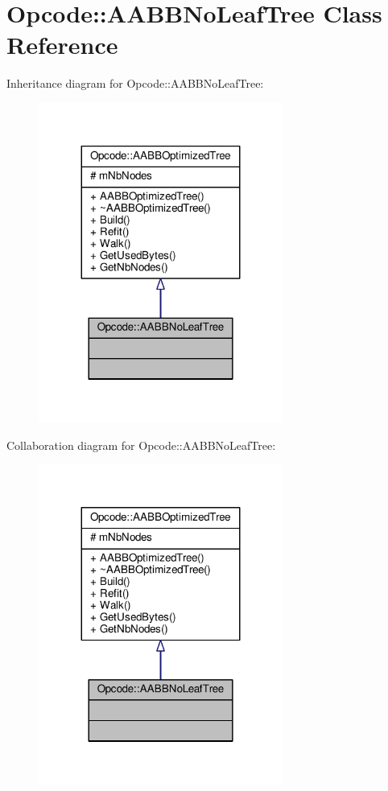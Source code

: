 \hypertarget{classOpcode_1_1AABBNoLeafTree}{}\section{Opcode\+:\+:A\+A\+B\+B\+No\+Leaf\+Tree Class Reference}
\label{classOpcode_1_1AABBNoLeafTree}


Inheritance diagram for Opcode\+:\+:A\+A\+B\+B\+No\+Leaf\+Tree\+:
\nopagebreak
\begin{figure}[H]
\begin{center}
\leavevmode
\includegraphics[width=227pt]{d4/d5d/classOpcode_1_1AABBNoLeafTree__inherit__graph}
\end{center}
\end{figure}


Collaboration diagram for Opcode\+:\+:A\+A\+B\+B\+No\+Leaf\+Tree\+:
\nopagebreak
\begin{figure}[H]
\begin{center}
\leavevmode
\includegraphics[width=227pt]{de/d4b/classOpcode_1_1AABBNoLeafTree__coll__graph}
\end{center}
\end{figure}

